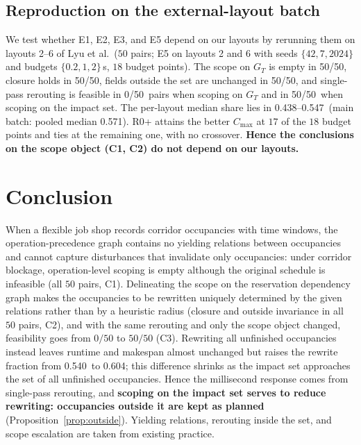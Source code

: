 \documentclass[manuscript,screen,review]{acmart}
\newcommand{\NPairs}{50}
\newcommand{\FeasRone}{0/\NPairs}            %
\newcommand{\FeasRtwo}{\NPairs/\NPairs}      %
\newcommand{\EoneFracMed}{0.571}    %
\newcommand{\NPubPairs}{50}
\newcommand{\PubPassMiss}{\NPubPairs/\NPubPairs}
\newcommand{\PubFeasRone}{0/\NPubPairs}
\newcommand{\PubFeasRtwo}{\NPubPairs/\NPubPairs}
\newcommand{\PubPassClosed}{\NPubPairs/\NPubPairs}
\newcommand{\PubPassInvar}{\NPubPairs/\NPubPairs}
\newcommand{\PubEoneFracLo}{0.438}
\newcommand{\PubEoneFracHi}{0.547}
\newcommand{\ResFracCheapRtwo}{0.540}
\newcommand{\ResFracAllFuture}{0.604}
\begin{document}
\subsection{Reproduction on the external-layout batch}
\label{sec:pubrepro}

We test whether E1, E2, E3, and E5 depend on our layouts by rerunning them on layouts 2--6 of Lyu et al.\ (\(\NPubPairs\) pairs; E5 on layouts 2 and 6 with seeds \(\{42,7,2024\}\) and budgets \(\{0.2,1,2\}\)\,s, \(18\) budget points).
The scope on \(G_T\) is empty in \PubPassMiss, closure holds in \PubPassClosed, fields outside the set are unchanged in \PubPassInvar, and single-pass rerouting is feasible in \PubFeasRone\ pairs when scoping on \(G_T\) and in \PubFeasRtwo\ when scoping on the impact set.
The per-layout median share lies in \PubEoneFracLo--\PubEoneFracHi\ (main batch: pooled median \EoneFracMed).
R0+ attains the better \(C_{\max}\) at \(17\) of the \(18\) budget points and ties at the remaining one, with no crossover.
\textbf{Hence the conclusions on the scope object (C1, C2) do not depend on our layouts.}

\section{Conclusion}
\label{sec:conclusion}

When a flexible job shop records corridor occupancies with time windows, the operation-precedence graph contains no yielding relations between occupancies and cannot capture disturbances that invalidate only occupancies:
under corridor blockage, operation-level scoping is empty although the original schedule is infeasible (all \(\NPairs\) pairs, C1).
Delineating the scope on the reservation dependency graph makes the occupancies to be rewritten uniquely determined by the given relations rather than by a heuristic radius (closure and outside invariance in all \(\NPairs\) pairs, C2),
and with the same rerouting and only the scope object changed, feasibility goes from \(\FeasRone\) to \(\FeasRtwo\) (C3).
Rewriting all unfinished occupancies instead leaves runtime and makespan almost unchanged but raises the rewrite fraction from \ResFracCheapRtwo\ to \ResFracAllFuture; this difference shrinks as the impact set approaches the set of all unfinished occupancies.
Hence the millisecond response comes from single-pass rerouting, and \textbf{scoping on the impact set serves to reduce rewriting: occupancies outside it are kept as planned} (Proposition~\ref{prop:outside}).
Yielding relations, rerouting inside the set, and scope escalation are taken from existing practice.
\end{document}
